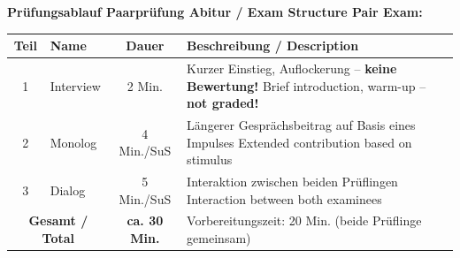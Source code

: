 \documentclass[10pt,a4paper]{article}
\begin{document}
\begin{center}
\small
\textbf{Prüfungsablauf Paarprüfung Abitur / Exam Structure Pair Exam:}
\vspace{1mm}

\begin{tabular}{|c|p{3.5cm}|c|p{6cm}|}
\hline
\rowcolor{lightgray}
\textbf{Teil} & \textbf{Name} & \textbf{Dauer} & \textbf{Beschreibung / Description} \\
\hline
1 & Interview & 2 Min. & Kurzer Einstieg, Auflockerung -- \textbf{keine Bewertung!} \newline \textcolor{english}{\footnotesize Brief introduction, warm-up -- \textbf{not graded!}} \\
\hline
2 & Monolog & 4 Min./SuS & Längerer Gesprächsbeitrag auf Basis eines Impulses \newline \textcolor{english}{\footnotesize Extended contribution based on stimulus} \\
\hline
3 & Dialog & 5 Min./SuS & Interaktion zwischen beiden Prüflingen \newline \textcolor{english}{\footnotesize Interaction between both examinees} \\
\hline
\multicolumn{2}{|c|}{\textbf{Gesamt / Total}} & \textbf{ca. 30 Min.} & Vorbereitungszeit: 20 Min. (beide Prüflinge gemeinsam) \\
\hline
\end{tabular}
\end{center}

\vspace{2mm}
\end{document}
